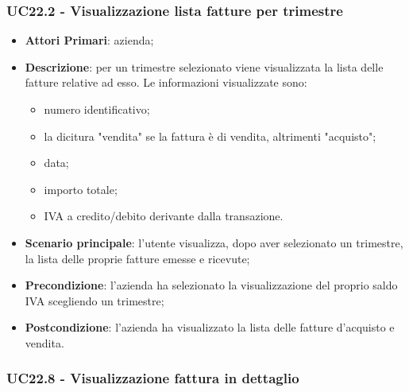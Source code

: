 \subsubsection{UC22.2 - Visualizzazione lista fatture per trimestre}
\begin{itemize}
	\item \textbf{Attori Primari}: azienda;
	\item \textbf{Descrizione}: per un trimestre selezionato viene visualizzata la lista delle fatture relative ad esso. Le informazioni visualizzate sono:
	\begin{itemize}
		\item numero identificativo;
		\item la dicitura "vendita" se la fattura è di vendita, altrimenti "acquisto";
		\item data;
		\item importo totale;
		\item IVA a credito/debito derivante dalla transazione.
	\end{itemize}
	\item \textbf{Scenario principale}: l'utente visualizza, dopo aver selezionato un trimestre, la lista delle proprie fatture emesse e ricevute;
	\item \textbf{Precondizione}: l'azienda ha selezionato la visualizzazione del proprio saldo IVA scegliendo un trimestre;
	\item \textbf{Postcondizione}: l'azienda ha visualizzato la lista delle fatture d'acquisto e vendita.
\end{itemize}

\subsubsection{UC22.8 - Visualizzazione fattura in dettaglio}

